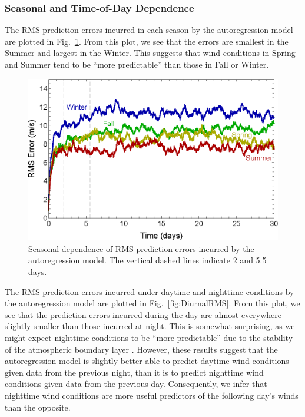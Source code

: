 \documentclass[11pt, oneside]{article}
\newcommand{\figref}[1]{Fig.~\ref{#1}}
\begin{document}
\subsubsection{Seasonal and Time-of-Day Dependence}
The RMS prediction errors incurred in each season by the autoregression model are plotted in \figref{fig:SeasonalRMS}.
From this plot, we see that the errors are smallest in the Summer and largest in the Winter.
This suggests that wind conditions in Spring and Summer tend to be ``more predictable'' than those in Fall or Winter. %

\begin{figure}[htb]
\centering
\includegraphics[width=0.7\columnwidth]{figures/SeasonalRMSPredictionError}
\caption{Seasonal dependence of RMS prediction errors incurred by the autoregression model.
The vertical dashed lines indicate 2 and 5.5 days.}
\label{fig:SeasonalRMS}
\end{figure}

The RMS prediction errors incurred under daytime and nighttime conditions by the autoregression model are plotted in \figref{fig:DiurnalRMS}.
From this plot, we see that the prediction errors incurred during the day are almost everywhere slightly smaller than those incurred at night.
This is somewhat surprising, as we might expect nighttime conditions to be ``more predictable'' due to the stability of the atmospheric boundary layer \citep[Fig.~1.7]{Stull1988}.
However, these results suggest that the autoregression model is slightly better able to predict daytime wind conditions given data from the previous night, than it is to predict nighttime wind conditions given data from the previous day.
Consequently, we infer that nighttime wind conditions are more useful predictors of the following day's winds than the opposite.
\end{document}

